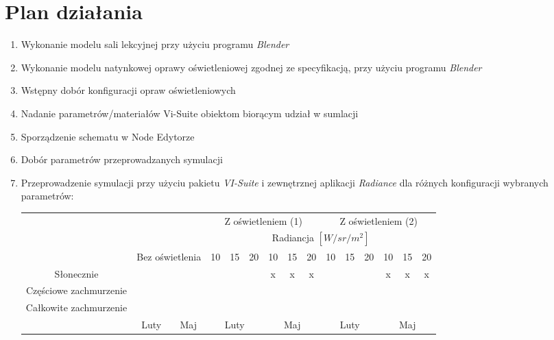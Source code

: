 \documentclass[a4paper,12pt]{article}
\begin{document}
	\section{Plan działania}
	\label{sec:plan_dzialania}
	\begin{enumerate}
		\item Wykonanie modelu sali lekcyjnej przy użyciu programu \emph{Blender} \checkmark
		\item Wykonanie modelu natynkowej oprawy oświetleniowej zgodnej ze specyfikacją, przy użyciu programu \emph{Blender} \checkmark
		\item Wstępny dobór konfiguracji opraw oświetleniowych \checkmark
		\item Nadanie parametrów/materiałów Vi-Suite obiektom biorącym udział w sumlacji \checkmark
		\item Sporządzenie schematu w Node Edytorze \checkmark
		\item Dobór parametrów przeprowadzanych symulacji \checkmark
		\item Przeprowadzenie symulacji przy użyciu pakietu \emph{VI-Suite} i zewnętrznej aplikacji \emph{Radiance} dla różnych konfiguracji wybranych parametrów:
		
		
		\begin{table}[h]
			\begin{center}
				\begin{tabular}{|c|c|c|c|c|c|c|c|c|c|c|c|c|c|c|}
					\cline{4-15}
					\multicolumn{3}{c|}{}&\multicolumn{6}{c|}{Z oświetleniem (1)} & \multicolumn{6}{c|}{Z oświetleniem (2)}\\ \cline{4-15}
					\multicolumn{3}{c|}{} & \multicolumn{12}{c|}{Radiancja $[W/sr/m^2]$} \\ \cline{2-15}
					\multicolumn{1}{c|}{}&\multicolumn{2}{c|}{Bez oświetlenia}& 10&15&20&10&15&20 & 10&15&20&10&15&20\\ \hline
					Słonecznie & \checkmark & \checkmark & \checkmark & \checkmark &\checkmark&x&x&x&\checkmark&\checkmark&\checkmark&x&x&x\\ \hline
					Częściowe zachmurzenie  & \checkmark & \checkmark & \checkmark & \checkmark &\checkmark& \checkmark & \checkmark & \checkmark &\checkmark&\checkmark&\checkmark&\checkmark&\checkmark&\checkmark  \\ \hline
					Całkowite zachmurzenie  & \checkmark & \checkmark & \checkmark & \checkmark & \checkmark & \checkmark & \checkmark & \checkmark &\checkmark&\checkmark&\checkmark&\checkmark&\checkmark&\checkmark \\ \hline
					\multicolumn{1}{c|}{}& Luty & Maj & \multicolumn{3}{c|}{Luty} & \multicolumn{3}{c|}{Maj} &  \multicolumn{3}{c|}{Luty} & \multicolumn{3}{c|}{Maj}\\ \cline{2-15}
					

\end{tabular}
\end{center}
\end{table}
\end{enumerate}
\end{document}
